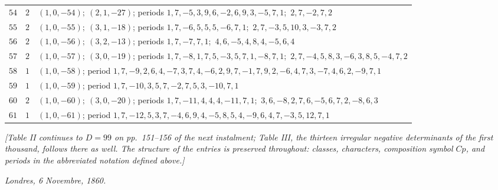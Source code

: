 \documentclass[11pt,a4paper]{article}
\theoremstyle{plain}
\begin{document}
\begin{longtable}{r|c|p{}}
$54$ & $2$ & $(1,0,-54);\ (2,1,-27)$; periods $1,7,-5,3,9,6,-2,6,9,3,-5,7,1$;\ $2,7,-2,7,2$ \\
$55$ & $2$ & $(1,0,-55);\ (3,1,-18)$; periods $1,7,-6,5,5,5,-6,7,1$;\ $2,7,-3,5,10,3,-3,7,2$ \\
$56$ & $2$ & $(1,0,-56);\ (3,2,-13)$; periods $1,7,-7,7,1$;\ $4,6,-5,4,8,4,-5,6,4$ \\
$57$ & $2$ & $(1,0,-57);\ (3,0,-19)$; periods $1,7,-8,1,7,5,-3,5,7,1,-8,7,1$;\ $2,7,-4,5,8,3,-6,3,8,5,-4,7,2$ \\
$58$ & $1$ & $(1,0,-58)$; period $1,7,-9,2,6,4,-7,3,7,4,-6,2,9,7,-1,7,9,2,-6,4,7,3,-7,4,6,2,-9,7,1$ \\
$59$ & $1$ & $(1,0,-59)$; period $1,7,-10,3,5,7,-2,7,5,3,-10,7,1$ \\
$60$ & $2$ & $(1,0,-60);\ (3,0,-20)$; periods $1,7,-11,4,4,4,-11,7,1$;\ $3,6,-8,2,7,6,-5,6,7,2,-8,6,3$ \\
$61$ & $1$ & $(1,0,-61)$; period $1,7,-12,5,3,7,-4,6,9,4,-5,8,5,4,-9,6,4,7,-3,5,12,7,1$ \\
\end{longtable}

\noindent\textit{[Table II continues to $D = 99$ on pp.~151--156 of the next instalment; Table III, the thirteen irregular negative determinants of the first thousand, follows there as well. The structure of the entries is preserved throughout: classes, characters, composition symbol $Cp$, and periods in the abbreviated notation defined above.]}

\medskip
\noindent\textit{Londres, 6 Novembre, 1860.}

\medskip
\noindent[Continues on p.~151 with Table II, $D = 62$ to $99$, and Table III.]
\end{document}
